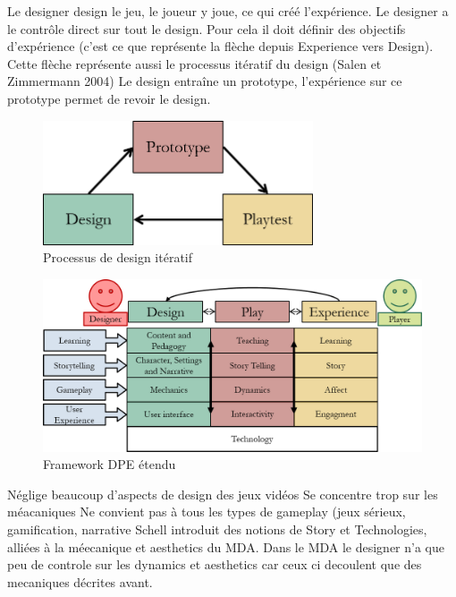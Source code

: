 Le designer design le jeu, le joueur y joue, ce qui créé l'expérience.
Le designer a le contrôle direct sur tout le design. Pour cela il doit définir des objectifs d'expérience (c'est ce que représente la flèche depuis Experience vers Design). Cette flèche représente aussi le processus itératif du design (Salen et Zimmermann 2004) Le design entraîne un prototype, l'expérience sur ce prototype permet de revoir le design.



\begin{figure}[H]
    \centering
    \includegraphics[width=8cm]{10_img/chap3/iteration_prototype.png} 
    \caption{Processus de design itératif \cite{Winn2011}}
\end{figure}

\begin{figure}[H]
    \centering
    \includegraphics[width=14cm]{10_img/chap3/dpe_extended.png} 
    \caption{Framework DPE étendu \cite{Winn2011}}
\end{figure}



Néglige beaucoup d'aspects de design des jeux vidéos
Se concentre trop sur les méacaniques
Ne convient pas à tous les types de gameplay (jeux sérieux, gamification, narrative
Schell introduit des notions de Story et Technologies, alliées à la méecanique et aesthetics du MDA. 
Dans le MDA le designer n'a que peu de controle sur les dynamics et aesthetics car ceux ci decoulent que des mecaniques décrites avant.


